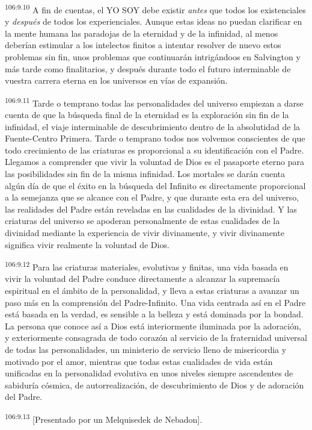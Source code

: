 \par
\textsuperscript{106:9.10} A fin de cuentas, el YO SOY debe existir \textit{antes} que todos los existenciales y \textit{después} de todos los experienciales. Aunque estas ideas no puedan clarificar en la mente humana las paradojas de la eternidad y de la infinidad, al menos deberían estimular a los intelectos finitos a intentar resolver de nuevo estos problemas sin fin, unos problemas que continuarán intrigándoos en Salvington y más tarde como finalitarios, y después durante todo el futuro interminable de vuestra carrera eterna en los universos en vías de expansión.

\par
\textsuperscript{106:9.11} Tarde o temprano todas las personalidades del universo empiezan a darse cuenta de que la búsqueda final de la eternidad es la exploración sin fin de la infinidad, el viaje interminable de descubrimiento dentro de la absolutidad de la Fuente-Centro Primera. Tarde o temprano todos nos volvemos conscientes de que todo crecimiento de las criaturas es proporcional a su identificación con el Padre. Llegamos a comprender que vivir la voluntad de Dios es el pasaporte eterno para las posibilidades sin fin de la misma infinidad. Los mortales se darán cuenta algún día de que el éxito en la búsqueda del Infinito es directamente proporcional a la semejanza que se alcance con el Padre, y que durante esta era del universo, las realidades del Padre están reveladas en las cualidades de la divinidad. Y las criaturas del universo se apoderan personalmente de estas cualidades de la divinidad mediante la experiencia de vivir divinamente, y vivir divinamente significa vivir realmente la voluntad de Dios.

\par
\textsuperscript{106:9.12} Para las criaturas materiales, evolutivas y finitas, una vida basada en vivir la voluntad del Padre conduce directamente a alcanzar la supremacía espiritual en el ámbito de la personalidad, y lleva a estas criaturas a avanzar un paso más en la comprensión del Padre-Infinito. Una vida centrada así en el Padre está basada en la verdad, es sensible a la belleza y está dominada por la bondad. La persona que conoce así a Dios está interiormente iluminada por la adoración, y exteriormente consagrada de todo corazón al servicio de la fraternidad universal de todas las personalidades, un ministerio de servicio lleno de misericordia y motivado por el amor, mientras que todas estas cualidades de vida están unificadas en la personalidad evolutiva en unos niveles siempre ascendentes de sabiduría cósmica, de autorrealización, de descubrimiento de Dios y de adoración del Padre.

\par
\textsuperscript{106:9.13} [Presentado por un Melquisedek de Nebadon].